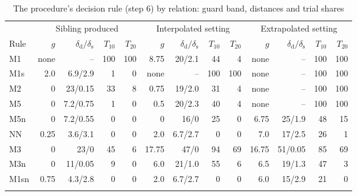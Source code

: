 \documentclass[pdflatex,sn-basic,lineno]{sn-jnl}
\newcommand{\tabsizesmall}{\footnotesize}%
\begin{document}
\begin{appendices}
\begin{table}[p]
\tabsizesmall
\setlength{\tabcolsep}{2.2pt}
\caption{The procedure's decision rule (step 6) by relation: guard band, distances and trial shares}\label{tab:step6}
\begin{tabular*}{\textwidth}{@{\extracolsep{\fill}}lrrrrrrrrrrrr@{}}
\toprule
 & \multicolumn{4}{c}{Sibling produced} & \multicolumn{4}{c}{Interpolated setting} & \multicolumn{4}{c}{Extrapolated setting} \\
\cmidrule(lr){2-5}\cmidrule(lr){6-9}\cmidrule(lr){10-13}
Rule & $g$ & $\delta_\mathrm{d}/\delta_\mathrm{s}$ & $T_{10}$ & $T_{20}$ & $g$ & $\delta_\mathrm{d}/\delta_\mathrm{s}$ & $T_{10}$ & $T_{20}$ & $g$ & $\delta_\mathrm{d}/\delta_\mathrm{s}$ & $T_{10}$ & $T_{20}$ \\
\midrule
M1 & none & -- & 100 & 100 & 8.75 & 20/2.1 & 44 & 4 & none & -- & 100 & 100 \\
M1s & 2.0 & 6.9/2.9 & 1 & 0 & none & -- & 100 & 100 & none & -- & 100 & 100 \\
M2 & 0 & 23/0.15 & 33 & 8 & 0.75 & 19/2.0 & 31 & 4 & none & -- & 100 & 100 \\
M5 & 0 & 7.2/0.75 & 1 & 0 & 0.5 & 20/2.3 & 40 & 4 & none & -- & 100 & 100 \\
M5n & 0 & 7.2/0.55 & 0 & 0 & 0 & 16/0 & 25 & 0 & 6.75 & 25/1.9 & 48 & 15 \\
NN & 0.25 & 3.6/3.1 & 0 & 0 & 2.0 & 6.7/2.7 & 0 & 0 & 7.0 & 17/2.5 & 26 & 1 \\
M3 & 0 & 23/0 & 45 & 6 & 17.75 & 47/0 & 94 & 69 & 16.75 & 51/0.05 & 85 & 69 \\
M3n & 0 & 11/0.05 & 9 & 0 & 6.0 & 21/1.0 & 55 & 6 & 6.5 & 19/1.3 & 47 & 3 \\
M1sn & 0.75 & 4.3/2.8 & 0 & 0 & 2.0 & 6.7/2.7 & 0 & 0 & 6.0 & 15/2.9 & 21 & 0 \\
\botrule
\end{tabular*}
\end{table}


\end{appendices}
\end{document}
